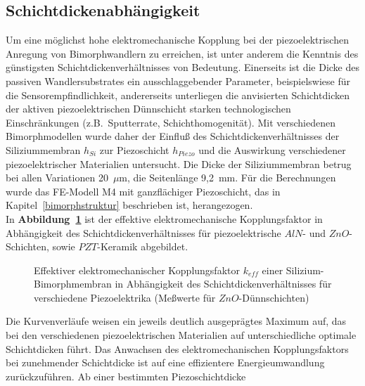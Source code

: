 \subsection{Schichtdickenabhängigkeit}
\label{schichtdickenabhaengigkeit}


Um eine möglichst hohe elektromechanische Kopplung bei der piezoelektrischen
Anregung von Bimorphwandlern zu erreichen, ist unter anderem die Kenntnis
des günstigsten Schichtdickenverhältnisses von Bedeutung. Einerseits ist die
Dicke des passiven Wandlersubstrates ein ausschlaggebender
Parameter, beispielswiese für die Sensorempfindlichkeit, andererseits
unterliegen die anvisierten Schichtdicken der aktiven piezoelektrischen
Dünnschicht starken technologischen Einschränkungen (z.B.\ Sputterrate,
Schichthomogenität).
Mit verschiedenen Bimorphmodellen wurde daher der Einfluß des
Schichtdickenverhältnisses der Siliziummembran $h_{Si}$ zur Piezoschicht
$h_{Piezo}$ und die Auswirkung verschiedener piezoelektrischer Materialien
untersucht. Die Dicke der Siliziummembran betrug bei allen Variationen
20~$\mu$m, die Seitenlänge 9,2~mm. Für die Berechnungen wurde das FE-Modell
M4 mit ganzflächiger Piezoschicht, das in Kapitel~\ref{bimorphstruktur}
beschrieben ist, herangezogen.\\
In {\bf Abbildung~\ref{abbkeffvontt}} ist der effektive elektromechanische
Kopplungsfaktor in Abhängigkeit des Schichtdickenverhältnisses für
piezoelektrische $AlN$- und $ZnO$-Schichten, sowie $PZT$-Keramik abgebildet.
\begin{figure}[htb]

\begin{center}

\setabbfdra
\end{center}
\caption{\label{abbkeffvontt}
 Effektiver elektromechanischer Kopplungsfaktor $k_{eff}$ einer
 Silizium-Bimorphmembran in Abhängigkeit des Schichtdickenverhältnisses
 für verschiedene Piezoelektrika (Meßwerte für $ZnO$-Dünnschichten)}
\end{figure}
Die Kurvenverläufe weisen ein jeweils deutlich ausgeprägtes Maximum auf,
das bei den verschiedenen piezoelektrischen Materialien auf unterschiedliche
optimale Schichtdicken führt. Das Anwachsen des elektromechanischen
Kopplungsfaktors bei zunehmender Schichtdicke ist auf eine effizientere
Energieumwandlung zurückzuführen. Ab einer bestimmten Piezoschichtdicke
